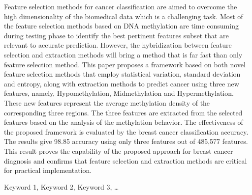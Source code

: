 Feature selection methods for cancer classification
are aimed to overcome the high dimensionality of the biomedical
data which is a challenging task. Most of the feature selection
methods based on DNA methylation are time consuming during
testing phase to identify the best pertinent features subset that
are relevant to accurate prediction. However, the hybridization
between feature selection and extraction methods will bring a
method that is far fast than only feature selection method. This
paper proposes a framework based on both novel feature
selection methods that employ statistical variation, standard
deviation and entropy, along with extraction methods to predict
cancer using three new features, namely, Hypomethylation,
Midmethylation and Hypermethylation. These new features
represent the average methylation density of the corresponding
three regions. The three features are extracted from the selected
features based on the analysis of the methylation behavior. The
effectiveness of the proposed framework is evaluated by the
breast cancer classification accuracy. The results give 98.85%
accuracy using only three features out of 485,577 features. This
result proves the capability of the proposed approach for breast
cancer diagnosis and confirms that feature selection and
extraction methods are critical for practical implementation. 



\begin{keywords}
Keyword 1, Keyword 2, Keyword 3, …
\end{keywords} 
